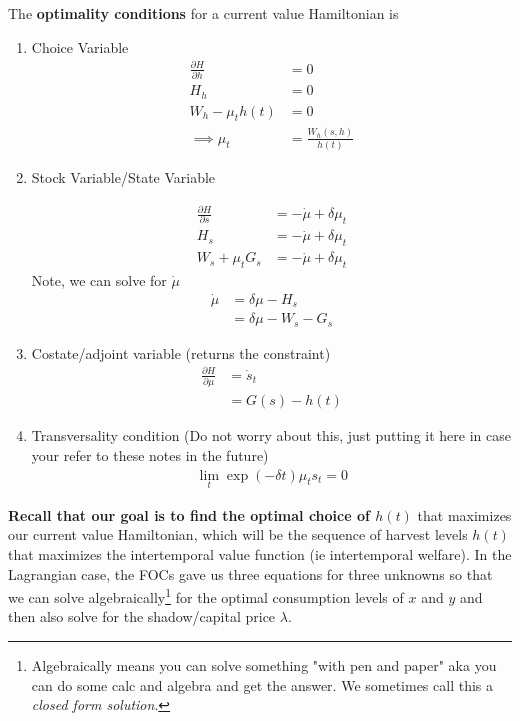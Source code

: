 \documentclass{article}
\begin{document}
The \textbf{optimality conditions} for a current value Hamiltonian is 
\begin{enumerate}
    \item Choice Variable 
    \begin{align}
        \frac{\partial H}{\partial h} & = 0\\
        H_h &= 0 \\
         W_h - \mu_t h(t)& = 0 \\
        \implies \mu_t & = \frac{W_h(s,h)}{h(t)}
        \label{oc_choice}
    \end{align}

    \item Stock Variable/State Variable 
    
    \begin{align}
        \frac{\partial H}{\partial s} & = - \dot \mu + \delta \mu_t \\
        H_s & = - \dot \mu + \delta \mu_t \\
        W_s + \mu_t G_s & = - \dot \mu + \delta \mu_t
        \label{oc_state}
    \end{align}
    Note, we can solve for $\dot \mu$
    \begin{align}
        \dot \mu &= \delta \mu - H_s \\
        &= \delta \mu - W_s - G_s
    \end{align}
    

    \item Costate/adjoint variable (returns the constraint)
    \begin{align}
        \frac{\partial H}{\partial \mu} &= \dot s_t \\
        &= G(s) - h(t)
        \label{oc_costate}
    \end{align}

    \item Transversality condition (Do not worry about this, just putting it here in case your refer to these notes in the future)
    \begin{align}
        \lim_t \exp(-\delta t) \mu_t s_t = 0
        \label{oc_trans}
    \end{align}

\end{enumerate}

\textbf{Recall that our goal is to find the optimal choice of $h(t)$} that maximizes our current value Hamiltonian, which will be the sequence of harvest levels $h(t)$ that maximizes the intertemporal value function (ie intertemporal welfare). In the Lagrangian case, the FOCs gave us three equations for three unknowns so that we can solve algebraically\footnote{Algebraically means you can solve something "with pen and paper" aka you can do some calc and algebra and get the answer. We sometimes call this a \textit{closed form solution}.} for the optimal consumption levels of $x$ and $y$ and then also solve for the shadow/capital price $\lambda$. \\
\end{document}
